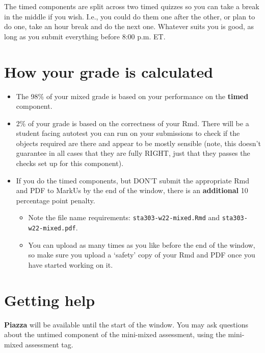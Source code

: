 \documentclass[
  openany]{book}
\providecommand{\tightlist}{%
  \setlength{\itemsep}{0pt}\setlength{\parskip}{0pt}}
\begin{document}
The timed components are split across two timed quizzes so you can take a break in the middle if you wish. I.e., you could do them one after the other, or plan to do one, take an hour break and do the next one. Whatever suits you is good, as long as you submit everything before 8:00 p.m. ET.

\hypertarget{how-your-grade-is-calculated-1}{%
\section{How your grade is calculated}\label{how-your-grade-is-calculated-1}}

\begin{itemize}
\tightlist
\item
  The 98\% of your mixed grade is based on your performance on the \textbf{timed} component.\\
\item
  2\% of your grade is based on the correctness of your Rmd. There will be a student facing autotest you can run on your submissions to check if the objects required are there and appear to be mostly sensible (note, this doesn't guarantee in all cases that they are fully RIGHT, just that they passes the checks set up for this component).\\
\item
  If you do the timed components, but DON'T submit the appropriate Rmd and PDF to MarkUs by the end of the window, there is an \textbf{additional} 10 percentage point penalty.

  \begin{itemize}
  \tightlist
  \item
    Note the file name requirements: \texttt{sta303-w22-mixed.Rmd} and \texttt{sta303-w22-mixed.pdf}.
  \item
    You can upload as many times as you like before the end of the window, so make sure you upload a `safety' copy of your Rmd and PDF once you have started working on it.
  \end{itemize}
\end{itemize}

\hypertarget{getting-help-1}{%
\section{Getting help}\label{getting-help-1}}

\textbf{Piazza} will be available until the start of the window. You may ask questions about the untimed component of the mini-mixed assessment, using the mini-mixed assessment tag.
\end{document}

